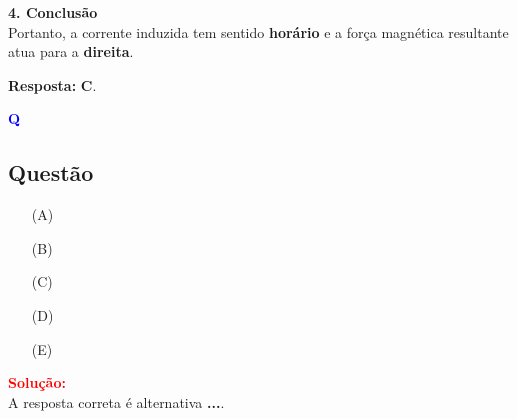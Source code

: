 \begin{flushleft}
\bigskip

\textbf{4. Conclusão}\\
Portanto, a corrente induzida tem sentido \textbf{horário} e a força magnética resultante atua para a \textbf{direita}.

\textbf{Resposta:} \colorbox{green!50}{\textbf{C}}.

\end{flushleft}



\begin{flushleft}
\textbf{\textcolor{blue}{\Large Q}}\\
\noindent

\subsection{Quest\~ao }

\begin{itemize}
\item[(A)] 
\item[(B)] 
\item[(C)] 
\item[(D)] 
\item[(E)] 
\end{itemize}

\vspace{0.5cm}

\textcolor{red}{\textbf{Solução:}}\\

A resposta correta é alternativa \colorbox{green!50}{\textbf{...}}.
\end{flushleft}